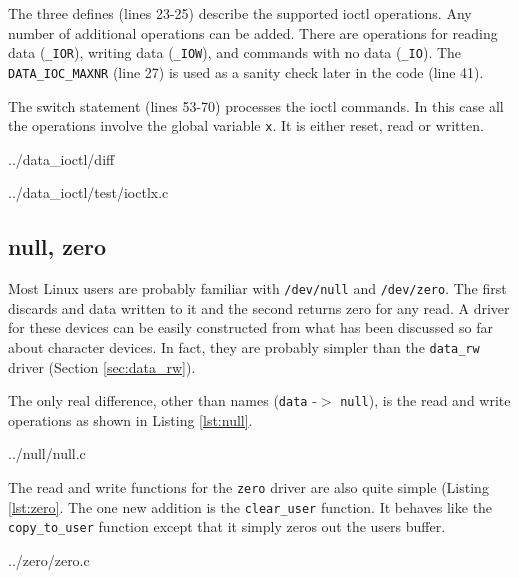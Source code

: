 \documentclass{article}
\begin{document}
The three defines (lines 23-25) describe the supported ioctl operations.
Any number of additional operations can be added.
There are operations for reading data (\verb+_IOR+), writing data (\verb+_IOW+),
and commands with no data (\verb+_IO+).
The \verb+DATA_IOC_MAXNR+ (line 27) is used as a sanity check
later in the code (line 41).

The switch statement (lines 53-70) processes the ioctl commands.
In this case all the operations involve the global variable \verb+x+.
It is either reset, read or written.

\clearpage

	{../data_ioctl/diff}


	{../data_ioctl/test/ioctlx.c}


\clearpage
\subsection{null, zero}

Most Linux users are probably familiar with \verb+/dev/null+ and
\verb+/dev/zero+.
The first discards and data written to it and the second returns
zero for any read.
A driver for these devices can be easily constructed from what has
been discussed so far about character devices.
In fact, they are probably simpler than the \verb+data_rw+ driver
(Section \ref{sec:data_rw}).

The only real difference, other than names (\verb+data+ -$>$ \verb+null+),
is the read and write operations as shown in Listing \ref{lst:null}.


	{../null/null.c}

The read and write functions for the \verb+zero+ driver are also quite
simple (Listing \ref{lst:zero}.
The one new addition is the \verb+clear_user+ function.
It behaves like the \verb+copy_to_user+ function except that it simply
zeros out the users buffer.


	{../zero/zero.c}

\end{document}
